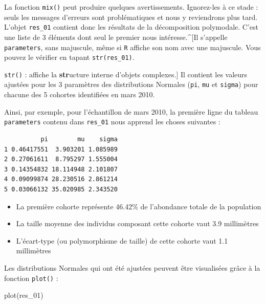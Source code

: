 \documentclass[
  a4paper,
  DIV=11,
  numbers=noendperiod,
  oneside]{scrreprt}
\newenvironment{Shaded}{}{}
\newcommand{\FunctionTok}[1]{\textcolor[rgb]{0.44,0.26,0.76}{#1}}
\newcommand{\NormalTok}[1]{\textcolor[rgb]{0.14,0.16,0.18}{#1}}
\newcommand{\SpecialCharTok}[1]{\textcolor[rgb]{0.00,0.36,0.77}{#1}}
\providecommand{\tightlist}{%
  \setlength{\itemsep}{0pt}\setlength{\parskip}{0pt}}\usepackage{longtable,booktabs,array}
\begin{document}
La fonction \texttt{mix()} peut produire quelques avertissements.
Ignorez-les à ce stade : seuls les messages d'erreurs sont
problématiques et nous y reviendrons plus tard. L'objet \texttt{res\_01}
contient donc les résultats de la décomposition polymodale. C'est une
liste de 3 éléments dont seul le premier nous intéresse.\^{}{[}Il
s'appelle \texttt{parameters}, sans majuscule, même si \texttt{R}
affiche son nom avec une majuscule. Vous pouvez le vérifier en tapant
\texttt{str(res\_01)}.

\texttt{str()} : affiche la \textbf{str}ucture interne d'objets
complexes.{]} Il contient les valeurs ajustées pour les 3 paramètres des
distributions Normales (\texttt{pi}, \texttt{mu} et \texttt{sigma}) pour
chacune des 5 cohortes identifiées en mars 2010.

Ainsi, par exemple, pour l'échantillon de mars 2010, la première ligne
du tableau \texttt{parameters} contenu dans \texttt{res\_01} nous
apprend les choses suivantes :

\begin{Shaded}
\end{Shaded}

\begin{verbatim}
          pi        mu    sigma
1 0.46417551  3.903201 1.085989
2 0.27061611  8.795297 1.555004
3 0.14354832 18.114948 2.101807
4 0.09099874 28.230516 2.861214
5 0.03066132 35.020985 2.343520
\end{verbatim}

\begin{itemize}
\tightlist
\item
  La première cohorte représente 46.42\% de l'abondance totale de la
  population
\item
  La taille moyenne des individus composant cette cohorte vaut 3.9
  millimètres
\item
  L'écart-type (ou polymorphisme de taille) de cette cohorte vaut 1.1
  millimètres
\end{itemize}

Les distributions Normales qui ont été ajustées peuvent être visualisées
grâce à la fonction \texttt{plot()} :

\begin{Shaded}
\begin{Highlighting}[]
\FunctionTok{plot}\NormalTok{(res\_01)}
\end{Highlighting}
\end{Shaded}
\end{document}
